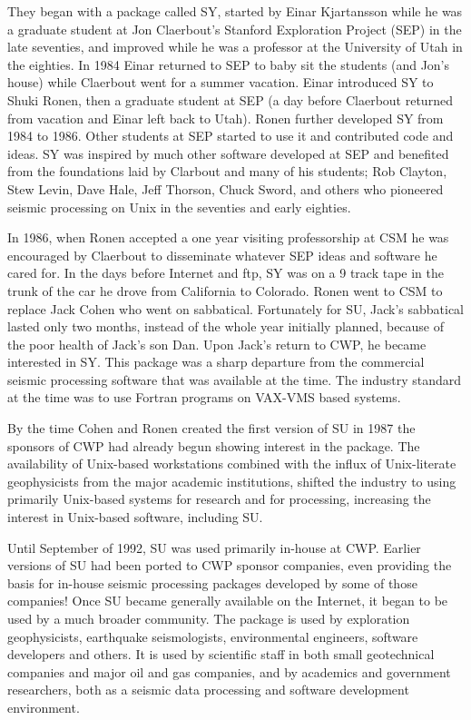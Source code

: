 They began with a package called SY, started by Einar Kjartansson while
he was a graduate student at Jon Claerbout's Stanford Exploration Project
(SEP) in the late seventies, and improved while he was a professor at 
the University of Utah in the eighties.  In 1984 Einar returned to 
SEP to baby sit the students (and Jon's house) while Claerbout went 
for a summer vacation.
Einar introduced SY to Shuki Ronen, then a graduate student at SEP (a day
before Claerbout returned from vacation and Einar left back to Utah).
Ronen further developed SY from 1984 to 1986.   Other students at SEP
started to use it and contributed code and ideas.  SY was inspired by much
other software developed at SEP and benefited from the foundations laid by
Clarbout and many of his students; Rob Clayton, Stew Levin, Dave Hale, Jeff
Thorson, Chuck Sword, and others who pioneered seismic processing on Unix
in the seventies and early eighties.  

In 1986, when Ronen accepted a one
year visiting professorship at CSM he was encouraged by Claerbout to
disseminate whatever SEP ideas and software he cared for.  In the days
before Internet and ftp, SY was on a 9 track tape in the trunk of the car
he drove from California to Colorado.  Ronen went to CSM to replace Jack
Cohen who went on sabbatical.  Fortunately for SU, Jack's sabbatical lasted
only two months, instead of the whole year initially planned, because of the
poor health of Jack's son Dan. Upon Jack's return to CWP, he became
interested in SY.  This package was a sharp departure from the commercial
seismic processing software that was available at the time. The industry
standard at the time was to use Fortran programs on VAX-VMS based systems.

By the time Cohen and Ronen created the first version of SU in 1987 the
sponsors of CWP had already begun showing interest in the package. The
availability of Unix-based workstations combined with the influx of
Unix-literate geophysicists from the major academic institutions, shifted
the industry to using primarily Unix-based systems for research and for
processing, increasing the interest in Unix-based software, including SU.

Until September of 1992, SU was used primarily in-house at CWP. Earlier
versions of SU had been ported to CWP sponsor companies, even providing the
basis for in-house seismic processing packages developed by some of those
companies! Once SU became generally available on the Internet, it began to
be used by a much broader community. The package is used by exploration
geophysicists, earthquake seismologists, environmental engineers, software
developers and others. It is used by scientific staff in both small
geotechnical companies and major oil and gas companies, and by academics
and government researchers, both as a seismic data processing and software
development environment.

